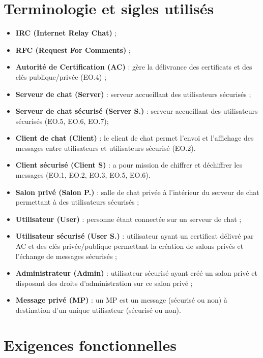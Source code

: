 \documentclass[a4paper,11pt,french]{article}
\begin{document}
\section{Terminologie et sigles utilisés}
\begin{itemize}
\item \textbf{IRC (Internet Relay Chat)} ;
\item \textbf{RFC (Request For Comments)} ;
\item \textbf{Autorité de Certification (AC)} : gère la délivrance des certificats et des clés publique/privée (EO.4) ;
\item \textbf{Serveur de chat (Server)} : serveur accueillant des utilisateurs sécurisés ;
\item \textbf{Serveur de chat sécurisé (Server S.)} : serveur accueillant des utilisateurs sécurisés (EO.5, EO.6, EO.7);
\item \textbf{Client de chat (Client)} : le client de chat permet l'envoi et l'affichage des messages entre utilisateurs et utilisateurs sécurisé (EO.2).
\item \textbf{Client sécurisé (Client S)} :  a pour mission de chiffrer et déchiffrer les messages (EO.1, EO.2, EO.3, EO.5, EO.6).
\item \textbf{Salon privé (Salon P.)} : salle de chat privée à l'intérieur du serveur de chat permettant à des utilisateurs sécurisés ;
\item \textbf{Utilisateur (User)} : personne étant connectée sur un serveur de chat ;
\item \textbf{Utilisateur sécurisé (User S.)} : utilisateur ayant un certificat délivré par AC et des clés privée/publique permettant la création de salons privés et l'échange de messages sécurisés ;
\item \textbf{Administrateur (Admin)} : utilisateur sécurisé ayant créé un salon privé et disposant des droits d'administration sur ce salon privé ;
\item \textbf{Message privé (MP)} : un MP est un message (sécurisé ou non) à destination d'un unique utilisateur (sécurisé ou non).
\end{itemize}

\section{Exigences fonctionnelles}
\end{document}
